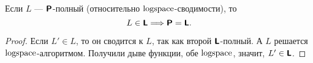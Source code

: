 \begin{thm}
	Если $ L$ --- $ \P$-полный (относительно $ \logspace$-сводимости), то
		$$ L \in \L \Longrightarrow  \P = \L.$$
\end{thm}
\begin{proof}
		Если $ L' \in L$, то он сводится к $ L$, так как второй $ \L$-полный. А $ L$ решается $ \logspace$-алгоритмом. 
			Получили дыве функции, обе $ \logspace$, значит, $ L' \in \L$.
\end{proof}
